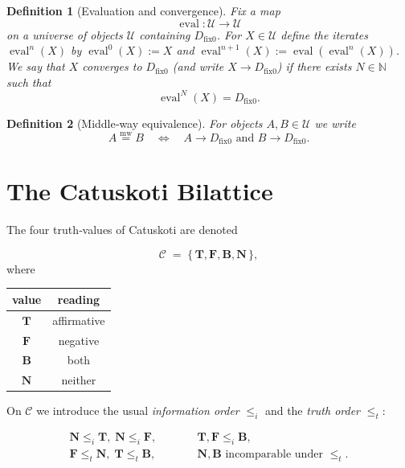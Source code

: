 \documentclass[12pt,a4paper]{article}
\newcommand{\dfix}{D_{\mathrm{fix}0}} %
\newcommand{\mw}{\mathrel{\overset{\mathrm{mw}}{=}}} %
\newtheorem{definition}{Definition}[section]
\begin{document}
\begin{definition}[Evaluation and convergence]
Fix a map
\[
  \operatorname{eval}:\mathcal{U}\to\mathcal{U}
\]
on a universe of objects $\mathcal{U}$ containing $\dfix$.
For $X\in\mathcal{U}$ define the iterates $\operatorname{eval}^n(X)$ by
$\operatorname{eval}^0(X):=X$ and $\operatorname{eval}^{n+1}(X):=\operatorname{eval}(\operatorname{eval}^n(X))$.
We say that $X$ \emph{converges} to $\dfix$ (and write $X\to\dfix$) if there exists $N\in\mathbb{N}$ such that
\[
  \operatorname{eval}^N(X)=\dfix.
\]
\end{definition}

\begin{definition}[Middle‑way equivalence]
For objects $A,B\in\mathcal{U}$ we write
\[
A\mw B
\quad\Longleftrightarrow\quad
A\to\dfix\text{ and }B\to\dfix.
\]
\end{definition}

\section{The Catuskoti Bilattice}

The four truth‑values of Catuskoti are denoted

$$
\mathcal{C}\;=\;\{\,\mathbf{T},\mathbf{F},
                 \mathbf{B},\mathbf{N}\,\},
$$
where

\begin{center}
\begin{tabular}{c|c}
value & reading \\ \hline
$\mathbf{T}$ & affirmative \\
$\mathbf{F}$ & negative \\
$\mathbf{B}$ & both \\
$\mathbf{N}$ & neither \\
\end{tabular}
\end{center}

On $\mathcal{C}$ we introduce the usual \emph{information order}
$\le_i$ and the \emph{truth order} $\le_t$:

$$
\begin{array}{ccl}
\mathbf{N}\le_i\mathbf{T},\;\mathbf{N}\le_i\mathbf{F},
&\qquad&
\mathbf{T},\mathbf{F}\le_i\mathbf{B},\\[2mm]
\mathbf{F}\le_t\mathbf{N},\;
\mathbf{T}\le_t\mathbf{B},
&\qquad&
\mathbf{N},\mathbf{B}\text{ incomparable under }\le_t .
\end{array}
$$
\end{document}
